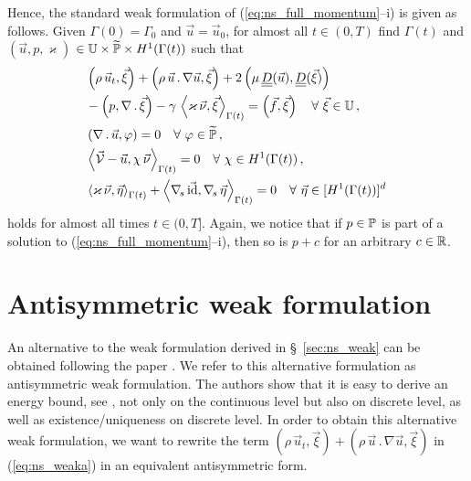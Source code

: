 Hence, the standard weak formulation of (\ref{eq:ns_full_momentum}--i) is given
as follows. Given $\Gamma(0) = \Gamma_0$ and $\vec u = \vec u_0$, for almost
all $t\in(0,T)$ find $\Gamma(t)$ and ${(\vec u, p, \varkappa)}$ ${\in \mathbb{U}
\times \widetilde{\mathbb{P}} \times H^1(\Gamma(t))}$ such that
\begin{subequations}
\begin{align}
& \left(\rho\,\vec u_t, \vec \xi\right) + \left(\rho\,\vec u \,.\, \nabla \vec
u,\vec \xi\right) + 2\left(\mu\,\mat D(\vec u), \mat D(\vec \xi)\right)
\nonumber \\
& - \left(p, \nabla\,.\,\vec \xi\right)
- \gamma\,\left\langle \varkappa\,\vec\nu, \vec\xi\right\rangle_{\Gamma(t)}
= \left(\vec f, \vec \xi\right)\quad \forall\ \vec\xi \in \uspace \,,
\label{eq:ns_weaka}\\
& \left(\nabla\,.\,\vec u, \varphi\right) = 0
\quad \forall\ \varphi \in \pnormspace\,, \label{eq:ns_weakb} \\
&  \left\langle \V
- \vec u, \chi\,\vec\nu \right\rangle_{\Gamma(t)} = 0
\quad \forall\ \chi \in H^1(\Gamma(t))\,, \label{eq:ns_weakc} \\
& \left\langle \varkappa\,\vec\nu, \vec\eta \right\rangle_{\Gamma(t)}
+ \left\langle \nabs\,\vec \id, \nabs\,\vec \eta \right\rangle_{\Gamma(t)}
= 0  \quad \forall\ \vec\eta \in [H^1(\Gamma(t))]^d\,\label{eq:ns_weakd}
\end{align}
\end{subequations}
holds for almost all times $t \in (0,T]$. Again, we notice that if
$p \in \mathbb{P}$ is part of a solution to (\ref{eq:ns_full_momentum}--i), then
so is $p + c$ for an arbitrary $c\in {\mathbb R}$.

\section{Antisymmetric weak formulation}\label{sec:ns_weak_antisym}
An alternative to the weak formulation derived in \S~\ref{sec:ns_weak}
can be obtained following the paper \cite{fluidfbp}. We refer to this
alternative formulation as antisymmetric weak formulation. The authors show that
it is easy to derive an energy bound, see \cite[eq. 3.7]{fluidfbp}, not only on
the continuous level but also on discrete level, as well as
existence/uniqueness on discrete level. In order to obtain this alternative
weak formulation, we want to rewrite the term $\left(\rho\,\vec u_t, \vec
\xi\right) + \left(\rho\,\vec u \,.\, \nabla \vec u,\vec \xi\right)$ in
(\ref{eq:ns_weaka}) in an equivalent antisymmetric form.

